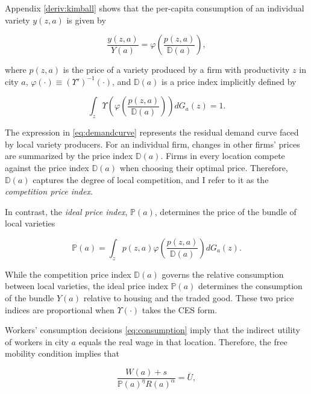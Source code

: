 Appendix \ref{deriv:kimball} shows that the per-capita consumption of an individual variety $y(z,a)$ is given by  

\begin{equation}\label{eq:demandcurve}
	\frac{y(z,a)}{Y(a)} = \varphi\left(\frac{p(z,a)}{\mathbb{D}(a)}\right),
\end{equation}  

where $p(z,a)$ is the price of a variety produced by a firm with productivity $z$ in city $a$, $\varphi(\cdot) \equiv \left(\Upsilon'\right)^{-1}(\cdot)$, and $\mathbb{D}(a)$ is a price index implicitly defined by  

\begin{equation}\label{eq:comppi}
	\int_{z} \Upsilon\left(\varphi\left(\frac{p(z,a)}{\mathbb{D}(a)}\right)\right)dG_a(z) = 1.
\end{equation}  

The expression in \eqref{eq:demandcurve} represents the residual demand curve faced by local variety producers. For an individual firm, changes in other firms' prices are summarized by the price index $\mathbb{D}(a)$. Firms in every location compete against the price index $\mathbb{D}(a)$ when choosing their optimal price. Therefore, $\mathbb{D}(a)$ captures the degree of local competition, and I refer to it as the \textit{competition price index}.  

In contrast, the \textit{ideal price index}, $\mathbb{P}(a)$, determines the price of the bundle of local varieties

\begin{equation}\label{eq:idealpi}
	\mathbb{P}(a) = \int_{z} p(z,a) \varphi\left(\frac{p(z,a)}{\mathbb{D}(a)}\right) dG_a(z).
\end{equation}  

While the competition price index $\mathbb{D}(a)$ governs the relative consumption between local varieties, the ideal price index $\mathbb{P}(a)$ determines the consumption of the bundle $Y(a)$ relative to housing and the traded good. These two price indices are proportional when $\Upsilon(\cdot)$ takes the CES form.

Workers' consumption decisions \eqref{eq:consumption} imply that the indirect utility of workers in city $a$ equals the real wage in that location. Therefore, the free mobility condition implies that 

\begin{equation}\label{eq:freemob}
	\frac{W(a) + s}{\mathbb{P}(a)^\eta R(a)^\alpha} = \overline{U},
\end{equation}  

